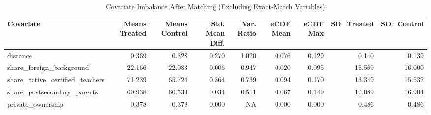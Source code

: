 \begin{table}

\caption{\label{tab:tab:balance_after}Covariate Imbalance After Matching (Excluding Exact‐Match Variables)}
\centering
\begin{tabular}[t]{lrrrrrrrr}
\toprule
Covariate & Means Treated & Means Control & Std. Mean Diff. & Var. Ratio & eCDF Mean & eCDF Max & SD\_Treated & SD\_Control\\
\midrule
distance & 0.369 & 0.328 & 0.270 & 1.020 & 0.076 & 0.129 & 0.140 & 0.139\\
share\_foreign\_background & 22.166 & 22.083 & 0.006 & 0.947 & 0.020 & 0.095 & 15.569 & 16.000\\
share\_active\_certified\_teachers & 71.239 & 65.724 & 0.364 & 0.739 & 0.094 & 0.170 & 13.349 & 15.532\\
share\_postsecondary\_parents & 60.938 & 60.539 & 0.034 & 0.511 & 0.067 & 0.149 & 12.089 & 16.904\\
private\_ownership & 0.378 & 0.378 & 0.000 & NA & 0.000 & 0.000 & 0.486 & 0.486\\
\bottomrule
\end{tabular}
\end{table}
